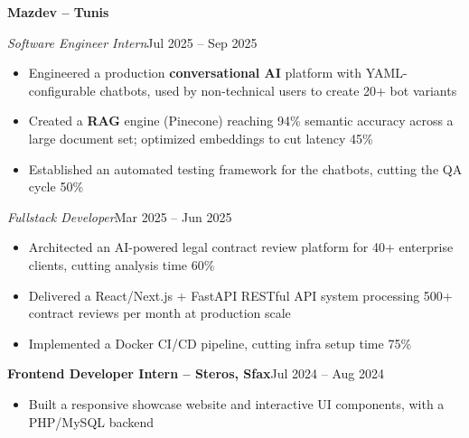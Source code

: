 \documentclass[10pt,a4paper]{article}
\newcommand{\entry}[2]{\vspace{1pt}\noindent\textbf{#1}\hfill{\color{muted}#2}\par}
\newcommand{\subentry}[2]{\noindent\textit{#1}\hfill{\color{muted}#2}\par}
\begin{document}
\entry{Mazdev -- Tunis}{}
\subentry{Software Engineer Intern}{Jul 2025 -- Sep 2025}
\begin{itemize}
  \item Engineered a production \textbf{conversational AI} platform with YAML-configurable chatbots, used by non-technical users to create 20+ bot variants
  \item Created a \textbf{RAG} engine (Pinecone) reaching 94\% semantic accuracy across a large document set; optimized embeddings to cut latency 45\%
  \item Established an automated testing framework for the chatbots, cutting the QA cycle 50\%
\end{itemize}
\subentry{Fullstack Developer}{Mar 2025 -- Jun 2025}
\begin{itemize}
  \item Architected an AI-powered legal contract review platform for 40+ enterprise clients, cutting analysis time 60\%
  \item Delivered a React/Next.js + FastAPI RESTful API system processing 500+ contract reviews per month at production scale
  \item Implemented a Docker CI/CD pipeline, cutting infra setup time 75\%
\end{itemize}

\entry{Frontend Developer Intern -- Steros, Sfax}{Jul 2024 -- Aug 2024}
\begin{itemize}
  \item Built a responsive showcase website and interactive UI components, with a PHP/MySQL backend
\end{itemize}
\end{document}
